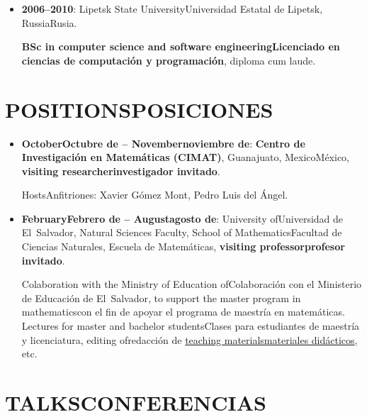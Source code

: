 \documentclass{article}
\newcommand{\biling}[2]{\ifdefined\english#1\fi\ifdefined\spanish#2\fi}
\begin{document}
\begin{itemize}
  \textbf{\biling{MSc in theoretical computer science}{Maestro en Ciencias con orientación en informática teórica}},
  diploma cum laude.

  \biling{Thesis advisor}{Director de tesis}: Dmitrii Pasechnik.

\item \textbf{2006--2010}: \biling{Lipetsk State University}{Universidad Estatal de Lipetsk}, \biling{Russia}{Rusia}.

  \textbf{\biling{BSc in computer science and software engineering}{Licenciado en ciencias de computación y programación}},
  diploma cum laude.
\end{itemize}

\pagebreak

{\color{RoyalBlue}\section*{\biling{POSITIONS}{POSICIONES}}}

\begin{itemize}
\item \textbf{\biling{October}{Octubre de} 2019 -- \biling{November}{noviembre de} 2020}:
  \textbf{Centro de Investigación en Matemáticas (CIMAT)},
  Guanajuato, \biling{Mexico}{México}, \textbf{\biling{visiting researcher}{investigador invitado}}.
  
  \biling{Hosts}{Anfitriones}: Xavier Gómez Mont, Pedro Luis del Ángel.

\item \textbf{\biling{February}{Febrero de} 2018 -- \biling{August}{agosto de} 2019}:
  \biling{University of}{Universidad de} El~Salvador,
  \biling{Natural Sciences Faculty, School of Mathematics}{Facultad de Ciencias Naturales, Escuela de Matemáticas},
  \textbf{\biling{visiting professor}{profesor invitado}}.

  \biling{Colaboration with the Ministry of Education of}{Colaboración con el Ministerio de Educación de} El~Salvador,
  \biling{to support the master program in mathematics}{con el fin de apoyar el programa de maestría en matemáticas}.
  \biling{Lectures for master and bachelor students}{Clases para estudiantes de maestría y licenciatura},
  \biling{editing of}{redacción de}
  \href{https://cadadr.org/san-salvador/}{\biling{teaching materials}{materiales didácticos}}, etc.
\end{itemize}

{\color{RoyalBlue}\section*{\biling{TALKS}{CONFERENCIAS}}}
\end{document}
